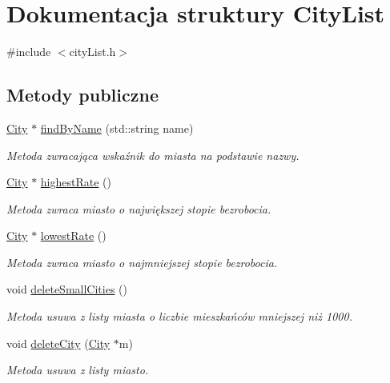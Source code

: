 \hypertarget{struct_city_list}{}\section{Dokumentacja struktury City\+List}
\label{struct_city_list}


{\ttfamily \#include $<$city\+List.\+h$>$}

\subsection*{Metody publiczne}
\begin{DoxyCompactItemize}
\item 
\mbox{\hyperlink{struct_city}{City}} $\ast$ \mbox{\hyperlink{struct_city_list_a9c1f021c9d6309a3151d35965019dbe3}{find\+By\+Name}} (std\+::string name)
\begin{DoxyCompactList}\small\item\em Metoda zwracająca wskaźnik do miasta na podstawie nazwy. \end{DoxyCompactList}\item 
\mbox{\hyperlink{struct_city}{City}} $\ast$ \mbox{\hyperlink{struct_city_list_a2c9311fdf240fe5faab78d50633d75f1}{highest\+Rate}} ()
\begin{DoxyCompactList}\small\item\em Metoda zwraca miasto o największej stopie bezrobocia. \end{DoxyCompactList}\item 
\mbox{\hyperlink{struct_city}{City}} $\ast$ \mbox{\hyperlink{struct_city_list_ac33c6ce8afc982eb2c69d3a258a303a7}{lowest\+Rate}} ()
\begin{DoxyCompactList}\small\item\em Metoda zwraca miasto o najmniejszej stopie bezrobocia. \end{DoxyCompactList}\item 
void \mbox{\hyperlink{struct_city_list_a0c431be0c91c6b6b3d097118aa6c12fe}{delete\+Small\+Cities}} ()
\begin{DoxyCompactList}\small\item\em Metoda usuwa z listy miasta o liczbie mieszkańców mniejszej niż 1000. \end{DoxyCompactList}\item 
void \mbox{\hyperlink{struct_city_list_a81296a875ed31c453c8579fdb84d4be0}{delete\+City}} (\mbox{\hyperlink{struct_city}{City}} $\ast$m)
\begin{DoxyCompactList}\small\item\em Metoda usuwa z listy miasto. \end{DoxyCompactList}\item 

\end{DoxyCompactItemize}
